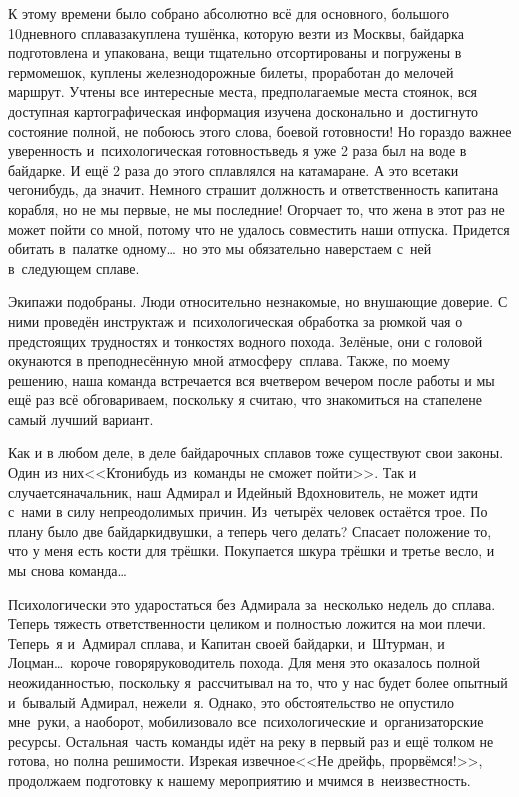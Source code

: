 К этому времени было собрано абсолютно всё для основного, большого 10\sdash дневного сплава\mdash закуплена тушёнка, которую везти из Москвы, байдарка подготовлена и упакована, вещи тщательно отсортированы и погружены в гермомешок, куплены железнодорожные билеты, проработан до мелочей маршрут. Учтены все интересные места, предполагаемые места стоянок, вся доступная картографическая информация изучена досконально и~достигнуто состояние полной, не побоюсь этого слова, боевой готовности! Но гораздо  важнее уверенность и~психологическая готовность\mdash ведь я уже 2 раза был на воде в байдарке. И ещё 2 раза до этого сплавлялся на катамаране. А это все\sdash таки чего\sdash нибудь, да значит. Немного страшит должность и ответственность капитана корабля, но не мы первые, не мы последние! Огорчает то, что жена в этот раз не может пойти со мной, потому что не удалось совместить наши отпуска. Придется обитать в~палатке одному\ldots~но это мы обязательно наверстаем с~ней в~следующем сплаве. 

Экипажи подобраны. Люди относительно незнакомые, но внушающие доверие. С ними проведён инструктаж и~психологическая обработка за рюмкой чая о предстоящих трудностях и тонкостях водного похода. Зелёные, они с головой окунаются в преподнесённую мной атмосферу~сплава. Также, по моему решению, наша команда встречается вся вчетвером вечером после работы и мы ещё раз всё обговариваем, поскольку я считаю, что знакомиться на стапеле\mdash не самый лучший вариант.

Как и в любом деле, в деле байдарочных сплавов тоже существуют свои законы. Один из них\mdash <<Кто\sdash нибудь из~команды не сможет пойти>>. Так и случается\mdash начальник, наш Адмирал и Идейный Вдохновитель, не может идти с~нами в силу непреодолимых причин. Из~четырёх человек остаётся трое. По плану было две байдарки\sdash двушки, а теперь чего делать? Спасает положение то, что у меня есть кости для трёшки. Покупается шкура трёшки и третье весло, и мы снова команда\ldots
 
Психологически это удар\mdash остаться без Адмирала за~несколько недель до сплава. Теперь тяжесть ответственности целиком и полностью ложится на мои плечи. Теперь~я и~Адмирал сплава, и Капитан своей байдарки, и~Штурман, и Лоцман\ldots~короче говоря\mdash руководитель похода. Для меня это оказалось полной неожиданностью, поскольку я~рассчитывал на то, что у нас будет более опытный и~бывалый Адмирал, нежели~я. Однако, это обстоятельство не опустило мне~руки, а наоборот, мобилизовало все~психологические и~организаторские ресурсы. Остальная~часть команды идёт на реку в первый раз и ещё толком не готова, но полна решимости. Изрекая извечное\mdash <<Не дрейфь, прорвёмся!>>, продолжаем подготовку к нашему мероприятию и мчимся в~неизвестность. 

\begin{center}
\end{center}